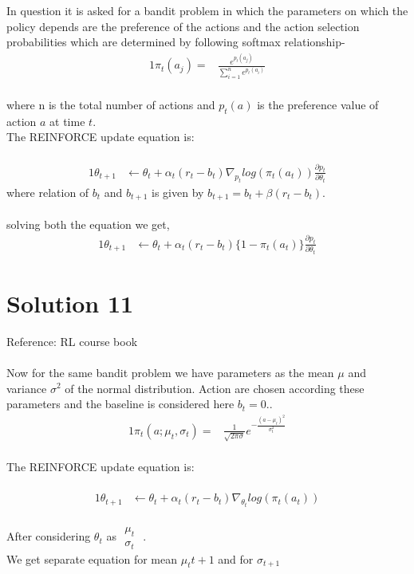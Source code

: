 \documentclass{article}
\begin{document}
In question it is asked for a bandit problem in which the parameters on which the policy depends are the preference of the actions and the action selection probabilities which are determined by following softmax relationship-
\begin{alignat*}{1}
\pi_{t}(a_{j})= & \frac{e^{p_{t}(a_{j})}}{\sum_{i=1}^{n}e^{p_{t}(a_{i})}}
\end{alignat*}
\\
where n is the total number of actions and $p_{t}(a)$ is the preference value of action $a$ at time $t$.\\
The REINFORCE update equation is:\\
\\
\begin{alignat*}{1}
\theta_{t+1} & \leftarrow\theta_{t}+\alpha_{t}(r_{t}-b_{t})\nabla_{p_{t}}log(\pi_{t}(a_{t}))\frac{\partial p_{t}}{\partial\theta_{t}}
\end{alignat*}
$ $\\
where relation of $b_{t}$ and $b_{t+1}$ is given by $b_{t+1}=b_{t}+\beta(r_{t}-b_{t})$.\\
\\
solving both the equation we get,
\begin{alignat*}{1}
\theta_{t+1} & \leftarrow\theta_{t}+\alpha_{t}(r_{t}-b_{t})\{1-\pi_{t}(a_{t})\}\frac{\partial p_{t}}{\partial\theta_{t}}
\end{alignat*}


\section{Solution 11}
Reference: RL course book\\\\
Now for the same bandit problem we have parameters as the mean $\mu$ and variance $\sigma^{2}$ of the normal distribution. Action are chosen according these parameters and the baseline is considered here $b_{t}=0$..
\\
\begin{alignat*}{1}
\pi_{t}(a;\mu_{t},\sigma_{t})= & \frac{1}{\sqrt{2\pi\sigma}}e^{-\frac{(a-\mu_{t})^{2}}{\sigma_{t}^{2}}}
\end{alignat*}
\\
The REINFORCE update equation is:\\
\\
\begin{alignat*}{1}
\theta_{t+1} & \leftarrow\theta_{t}+\alpha_{t}(r_{t}-b_{t})\nabla_{\theta_{t}}log(\pi_{t}(a_{t}))
\end{alignat*}
\\
After considering $\theta_{t}$ as $ \begin{array}{c}
\mu_{t}\\
\sigma_{t}
\end{array}$ . \\We get separate equation for mean $\mu_t{t+1}$
and for $\sigma_{t+1}$
\end{document}
